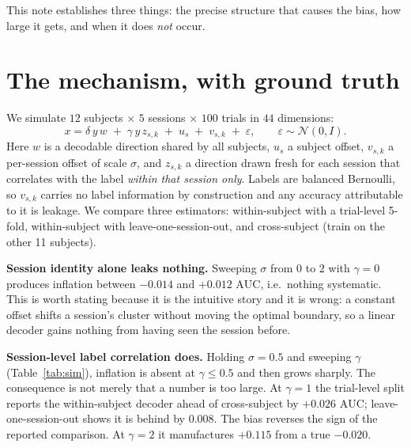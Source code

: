 \documentclass{article}
\newcommand{\auc}{\mathrm{AUC}}
\begin{document}
This note establishes three things: the precise structure that causes the bias, how large it gets,
and when it does \emph{not} occur.

\section{The mechanism, with ground truth}
\label{sec:sim}
We simulate $12$ subjects $\times$ $5$ sessions $\times$ $100$ trials in $44$ dimensions:
\begin{equation}
x = \delta\, y\, w \;+\; \gamma\, y\, z_{s,k} \;+\; u_s \;+\; v_{s,k} \;+\; \varepsilon,
\qquad \varepsilon \sim \mathcal{N}(0, I).
\end{equation}
Here $w$ is a decodable direction shared by all subjects, $u_s$ a subject offset, $v_{s,k}$ a
per-session offset of scale $\sigma$, and $z_{s,k}$ a direction drawn fresh for each session that
correlates with the label \emph{within that session only}. Labels are balanced Bernoulli, so
$v_{s,k}$ carries no label information by construction and any accuracy attributable to it is
leakage. We compare three estimators: within-subject with a trial-level 5-fold, within-subject with
leave-one-session-out, and cross-subject (train on the other 11 subjects).

\textbf{Session identity alone leaks nothing.} Sweeping $\sigma$ from $0$ to $2$ with $\gamma = 0$
produces inflation between $-0.014$ and $+0.012$ $\auc$, i.e.\ nothing systematic. This is worth
stating because it is the intuitive story and it is wrong: a constant offset shifts a session's
cluster without moving the optimal boundary, so a linear decoder gains nothing from having seen the
session before.

\textbf{Session-level label correlation does.} Holding $\sigma = 0.5$ and sweeping $\gamma$
(Table~\ref{tab:sim}), inflation is absent at $\gamma \leq 0.5$ and then grows sharply. The
consequence is not merely that a number is too large. At $\gamma = 1$ the trial-level split reports
the within-subject decoder ahead of cross-subject by $+0.026$ $\auc$; leave-one-session-out shows it
is behind by $0.008$. The bias reverses the sign of the reported comparison. At $\gamma = 2$ it
manufactures $+0.115$ from a true $-0.020$.
\end{document}

